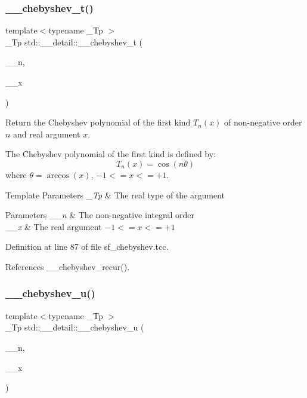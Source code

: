 \subsubsection{\texorpdfstring{\+\_\+\+\_\+chebyshev\+\_\+t()}{\_\_chebyshev\_t()}}
{\footnotesize\ttfamily template$<$typename \+\_\+\+Tp $>$ \\
\+\_\+\+Tp std\+::\+\_\+\+\_\+detail\+::\+\_\+\+\_\+chebyshev\+\_\+t (\begin{DoxyParamCaption}\item[{unsigned int}]{\+\_\+\+\_\+n,  }\item[{\+\_\+\+Tp}]{\+\_\+\+\_\+x }\end{DoxyParamCaption})}

Return the Chebyshev polynomial of the first kind $ T_n(x) $ of non-\/negative order $ n $ and real argument $ x $.

The Chebyshev polynomial of the first kind is defined by\+: \[ T_n(x) = \cos(n \theta) \] where $ \theta = \arccos(x) $, $ -1 <= x <= +1 $.


\begin{DoxyTemplParams}{Template Parameters}
{\em \+\_\+\+Tp} & The real type of the argument \\
\hline
\end{DoxyTemplParams}

\begin{DoxyParams}{Parameters}
{\em \+\_\+\+\_\+n} & The non-\/negative integral order \\
\hline
{\em \+\_\+\+\_\+x} & The real argument $ -1 <= x <= +1 $ \\
\hline
\end{DoxyParams}


Definition at line 87 of file sf\+\_\+chebyshev.\+tcc.



References \+\_\+\+\_\+chebyshev\+\_\+recur().

\mbox{\label{namespacestd_1_1____detail_aa3289db0a53f55007bc10dc94f15c1f7}} 
\subsubsection{\texorpdfstring{\+\_\+\+\_\+chebyshev\+\_\+u()}{\_\_chebyshev\_u()}}
{\footnotesize\ttfamily template$<$typename \+\_\+\+Tp $>$ \\
\+\_\+\+Tp std\+::\+\_\+\+\_\+detail\+::\+\_\+\+\_\+chebyshev\+\_\+u (\begin{DoxyParamCaption}\item[{unsigned int}]{\+\_\+\+\_\+n,  }\item[{\+\_\+\+Tp}]{\+\_\+\+\_\+x }\end{DoxyParamCaption})}


